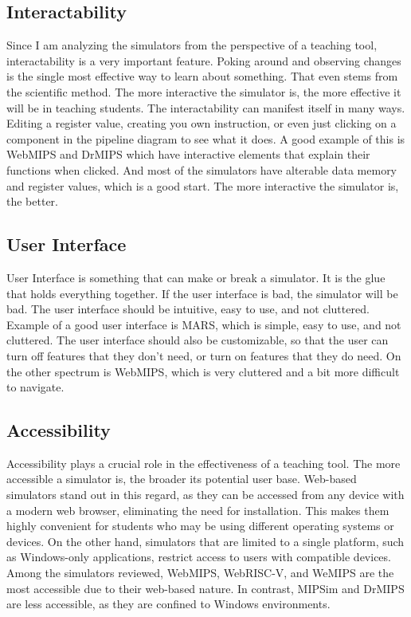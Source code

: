 \subsection{Interactability}\label{sec:interactability}
Since I am analyzing the simulators from the perspective of a teaching tool, interactability is a very important feature. Poking around and observing changes is the single most effective way to learn about something. That even stems from the scientific method. The more interactive the simulator is, the more effective it will be in teaching students. The interactability can manifest itself in many ways. Editing a register value, creating you own instruction, or even just clicking on a component in the pipeline diagram to see what it does. A good example of this is WebMIPS and DrMIPS which have interactive elements that explain their functions when clicked. And most of the simulators have alterable data memory and register values, which is a good start. The more interactive the simulator is, the better.

\subsection{User Interface}\label{sec:user_interface}
User Interface is something that can make or break a simulator. It is the glue that holds everything together. If the user interface is bad, the simulator will be bad. The user interface should be intuitive, easy to use, and not cluttered. Example of a good user interface is MARS, which is simple, easy to use, and not cluttered. The user interface should also be customizable, so that the user can turn off features that they don't need, or turn on features that they do need. On the other spectrum is WebMIPS, which is very cluttered and a bit more difficult to navigate. 

\subsection{Accessibility}\label{sec:accessibility}
Accessibility plays a crucial role in the effectiveness of a teaching tool. The more accessible a simulator is, the broader its potential user base. Web-based simulators stand out in this regard, as they can be accessed from any device with a modern web browser, eliminating the need for installation. This makes them highly convenient for students who may be using different operating systems or devices. On the other hand, simulators that are limited to a single platform, such as Windows-only applications, restrict access to users with compatible devices. Among the simulators reviewed, WebMIPS, WebRISC-V, and WeMIPS are the most accessible due to their web-based nature. In contrast, MIPSim and DrMIPS are less accessible, as they are confined to Windows environments.